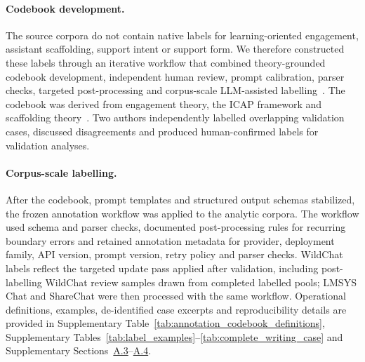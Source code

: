 \paragraph{Codebook development.}
The source corpora do not contain native labels for learning-oriented engagement, assistant scaffolding, support intent or support form.
We therefore constructed these labels through an iterative workflow that combined theory-grounded codebook development, independent human review, prompt calibration, parser checks, targeted post-processing and corpus-scale LLM-assisted labelling~\cite{gilardi2023chatgpt,ziems2024can}.
The codebook was derived from engagement theory, the ICAP framework and scaffolding theory~\cite{fredricks2004school,chi2014icap,wood1976role,van2010scaffolding,quintana2018scaffolding,reiser2004scaffolding}.
Two authors
independently labelled overlapping validation cases, discussed disagreements and produced human-confirmed labels for validation analyses.

\paragraph{Corpus-scale labelling.}
After the codebook, prompt templates and structured output schemas stabilized, the frozen annotation workflow was applied to the analytic corpora. The workflow used schema and parser checks, documented post-processing rules for recurring boundary errors and retained annotation metadata for provider, deployment family, API version, prompt version, retry policy and parser checks. WildChat labels reflect the targeted update pass applied after validation, including post-labelling WildChat review samples drawn from completed labelled pools; LMSYS Chat and ShareChat were then processed with the same workflow. Operational definitions, examples, de-identified case excerpts and reproducibility details are provided in Supplementary Table~\ref{tab:annotation_codebook_definitions}, Supplementary Tables~\ref{tab:label_examples}--\ref{tab:complete_writing_case} and Supplementary Sections~\hyperref[supp:a3]{A.3}--\hyperref[supp:a4]{A.4}.

